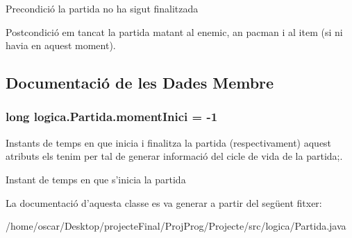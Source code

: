 \begin{DoxyPrecond}{Precondició}
la partida no ha sigut finalitzada 
\end{DoxyPrecond}
\begin{DoxyPostcond}{Postcondició}
em tancat la partida matant al enemic, an pacman i al item (si ni havia en aquest moment). 
\end{DoxyPostcond}


\subsection{Documentació de les Dades Membre}
\hypertarget{classlogica_1_1_partida_ae355797722d1ae3a44d644b818b068f5}{
\subsubsection[{moment\+Inici}]{\setlength{\rightskip}{0pt plus 5cm}long logica.\+Partida.\+moment\+Inici = -\/1\hspace{0.3cm}{\ttfamily [private]}}}\label{classlogica_1_1_partida_ae355797722d1ae3a44d644b818b068f5}


Instants de temps en que inicia i finalitza la partida (respectivament) aquest atributs els tenim per tal de generar informació del cicle de vida de la partida;. 

Instant de temps en que s'inicia la partida 

La documentació d'aquesta classe es va generar a partir del següent fitxer\+:\begin{DoxyCompactItemize}
\item 
/home/oscar/\+Desktop/projecte\+Final/\+Proj\+Prog/\+Projecte/src/logica/Partida.\+java\end{DoxyCompactItemize}
